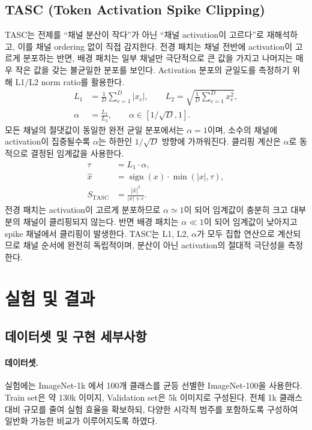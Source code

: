 \documentclass[10pt,twocolumn,letterpaper]{article}
\begin{document}
\subsection{TASC (Token Activation Spike Clipping)}

TASC는 전제를 ``채널 분산이 작다''가 아닌 ``채널 activation이 고르다''로 재해석하고, 이를 채널 ordering 없이 직접 감지한다. 전경 패치는 채널 전반에 activation이 고르게 분포하는 반면, 배경 패치는 일부 채널만 극단적으로 큰 값을 가지고 나머지는 매우 작은 값을 갖는 불균일한 분포를 보인다. Activation 분포의 균일도를 측정하기 위해 L1/L2 norm ratio를 활용한다.
\begin{align}
L_1 &= \frac{1}{D}\sum_{c=1}^{D}|x_c|,\qquad
L_2 = \sqrt{\frac{1}{D}\sum_{c=1}^{D}x_c^2},\\
\alpha &= \frac{L_1}{L_2},\qquad \alpha\in[1/\sqrt{D},1].
\end{align}
모든 채널의 절댓값이 동일한 완전 균일 분포에서는 $\alpha=1$이며, 소수의 채널에 activation이 집중될수록 $\alpha$는 하한인 $1/\sqrt{D}$ 방향에 가까워진다. 클리핑 계산은 $\alpha$로 동적으로 결정된 임계값을 사용한다.
\begin{align}
\tau &= L_1\cdot\alpha,\\
\hat{x} &= \operatorname{sign}(x)\cdot\min(|x|,\tau),\\
S_{\mathrm{TASC}} &= \frac{|\hat{x}|^2}{|x|+\epsilon}.
\end{align}
전경 패치는 activation이 고르게 분포하므로 $\alpha\simeq1$이 되어 임계값이 충분히 크고 대부분의 채널이 클리핑되지 않는다. 반면 배경 패치는 $\alpha\ll1$이 되어 임계값이 낮아지고 spike 채널에서 클리핑이 발생한다. TASC는 L1, L2, $\alpha$가 모두 집합 연산으로 계산되므로 채널 순서에 완전히 독립적이며, 분산이 아닌 activation의 절대적 극단성을 측정한다.

\section{실험 및 결과}

\subsection{데이터셋 및 구현 세부사항}

\paragraph{데이터셋.}
실험에는 ImageNet-1k \cite{russakovsky2015}에서 100개 클래스를 균등 선별한 ImageNet-100을 사용한다. Train set은 약 130k 이미지, Validation set은 5k 이미지로 구성된다. 전체 1k 클래스 대비 규모를 줄여 실험 효율을 확보하되, 다양한 시각적 범주를 포함하도록 구성하여 일반화 가능한 비교가 이루어지도록 하였다.
\end{document}
